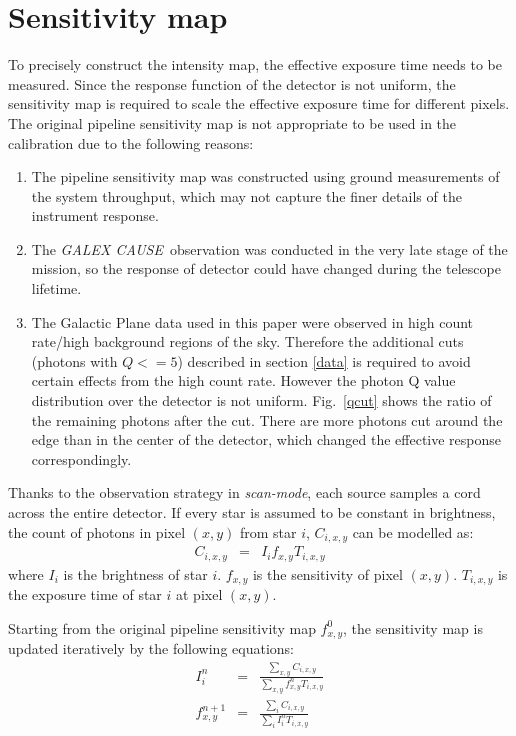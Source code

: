 \documentclass[12pt, preprint]{aastex61}
\newcommand{\project}[1]{\textsl{#1}}
\newcommand{\cause}{\project{GALEX CAUSE}}
\newcommand{\scanmode}{\project{scan-mode}}
\begin{document}
\section{Sensitivity map}
\label{sm}
To precisely construct the intensity map, the effective exposure time needs to be measured. 
Since the response function of the detector is not uniform, the sensitivity map is required to scale the effective exposure time for different pixels.
The original pipeline sensitivity map is not appropriate to be used in the calibration due to the following reasons:
\begin{enumerate}
\item The pipeline sensitivity map was constructed using ground measurements of the system throughput, which may not capture the finer details of the instrument response.
\item The \cause\ observation was conducted in the very late stage of the mission, so the response of detector could have changed during the telescope lifetime.
\item The Galactic Plane data used in this paper were observed in high count rate/high background regions of the sky.  
Therefore the additional cuts (photons with $Q<=5$) described in section \ref{data} is required to avoid certain effects from the high count rate. 
However the photon Q value distribution over the detector is not uniform.
Fig.~\ref{qcut} shows the ratio of the remaining photons after the cut.
There are more photons cut around the edge than in the center of the detector, which changed the effective response correspondingly.
\end{enumerate}

Thanks to the observation strategy in \scanmode, each source samples a cord across the entire detector. 
If every star is assumed to be constant in brightness, the count of photons in pixel $(x,y)$ from star $i$, $C_{i,x,y}$ can be modelled as:
\begin{eqnarray}
C_{i,x,y} &=& I_{i}f_{x,y}T_{i,x,y}
\end{eqnarray}
where $I_{i}$ is the brightness of star $i$. 
$f_{x,y}$ is the sensitivity of pixel $(x,y)$.
$T_{i,x,y}$ is the exposure time of star $i$ at pixel $(x,y)$.

Starting from the original pipeline sensitivity map $f_{x,y}^{0}$, the sensitivity map is updated iteratively by the following equations:
\begin{eqnarray}
I_{i}^{n} &=& \frac{\sum_{x,y}C_{i,x,y}}{\sum_{x,y} f_{x,y}^{n} T_{i,x,y}} \\
f_{x,y}^{n+1} &=& \frac{\sum_{i}C_{i,x,y}}{\sum_{i} I_{i}^{n} T_{i,x,y}}
\end{eqnarray}
\end{document}
